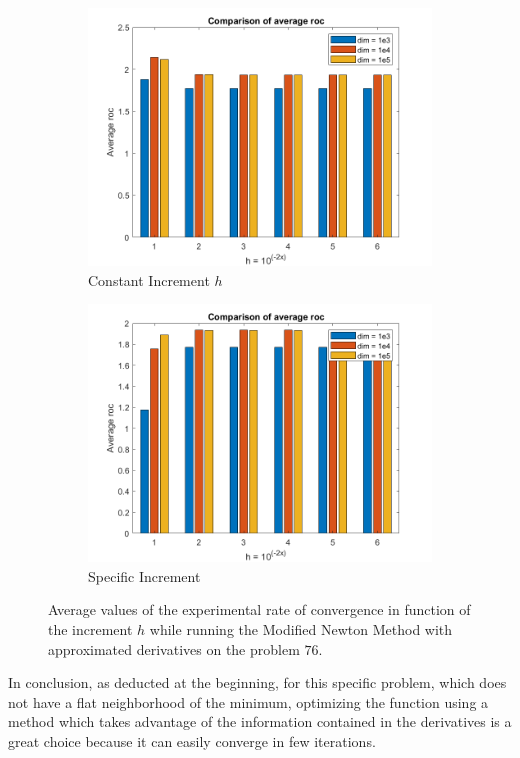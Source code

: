 \begin{figure}[htbp]
    \centering
    \begin{subfigure}[t]{0.45\textwidth}  %
        \centering
        \includegraphics[width=\textwidth]{img/pb76_MN_difffinite_COST_rateofconv.png}
        \caption{Constant Increment $h$}
    \end{subfigure}
    \hspace{1cm} %
    \begin{subfigure}[t]{0.45\textwidth}
        \centering
        \includegraphics[width=\textwidth]{img/pb76_MN_difffinite_REL_rateofconv.png}
        \caption{Specific Increment }
    \end{subfigure}
    \caption{ \small Average values of the experimental rate of convergence in function of the increment $h$  while running the Modified Newton Method with approximated derivatives on the problem $76$.}
    \label{76rocmn}
\end{figure}

In conclusion, as deducted at the beginning, for this specific problem, which does not have a flat neighborhood of the minimum, optimizing the function using a method which takes advantage of the information contained in the derivatives is a great choice because it can easily converge in few iterations.